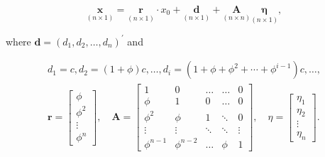 \documentclass[10pt]{article}
\begin{document}
\begin{equation*}
\underset{(n \times 1)}{\mathbf{x}}=\underset{(n \times 1)}{\mathbf{r}} \cdot x_{0}+\underset{(n \times 1)}{\mathbf{d}}+\underset{(n \times n)}{\mathbf{A}} \underset{(n \times 1)}{\boldsymbol{\eta}}, \tag{***}
\end{equation*}


where $\mathbf{d}=\left(d_{1}, d_{2}, \ldots, d_{n}\right)^{\prime}$ and

$$
\begin{gathered}
d_{1}=c, d_{2}=(1+\phi) c, \ldots, d_{i}=\left(1+\phi+\phi^{2}+\cdots+\phi^{i-1}\right) c, \ldots, \\
\mathbf{r}=\left[\begin{array}{c}
\phi \\
\phi^{2} \\
\vdots \\
\phi^{n}
\end{array}\right], \quad \mathbf{A}=\left[\begin{array}{ccccc}
1 & 0 & \ldots & \ldots & 0 \\
\phi & 1 & 0 & \ldots & 0 \\
\phi^{2} & \phi & 1 & \ddots & 0 \\
\vdots & \vdots & \ddots & \ddots & \vdots \\
\phi^{n-1} & \phi^{n-2} & \ldots & \phi & 1
\end{array}\right], \quad \eta=\left[\begin{array}{c}
\eta_{1} \\
\eta_{2} \\
\vdots \\
\eta_{n}
\end{array}\right] .
\end{gathered}
$$
\end{document}
